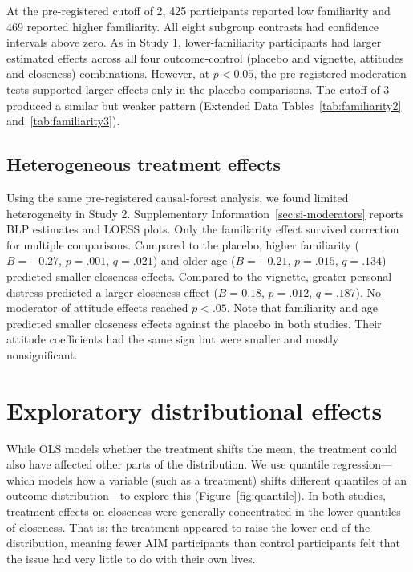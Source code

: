\documentclass[11pt]{article}
\begin{document}
At the pre-registered cutoff of 2, 425 participants reported low familiarity and 469 reported higher familiarity. All eight subgroup contrasts had confidence intervals above zero. As in Study 1, lower-familiarity participants had larger estimated effects across all four outcome-control (placebo and vignette, attitudes and closeness) combinations. However, at $p<0.05$, the pre-registered moderation tests supported larger effects only in the placebo comparisons. The cutoff of 3 produced a similar but weaker pattern (Extended Data Tables~\ref{tab:familiarity2} and~\ref{tab:familiarity3}).

\subsection{Heterogeneous treatment effects}
\label{sec:study-2-satellite-cybersecurity-heterogeneous-treatment-effects}

Using the same pre-registered causal-forest analysis, we found limited heterogeneity in Study 2. Supplementary Information~\ref{sec:si-moderators} reports BLP estimates and LOESS plots. Only the familiarity effect survived correction for multiple comparisons. Compared to the placebo, higher familiarity ($B=-0.27$, $p=.001$, $q=.021$) and older age ($B=-0.21$, $p=.015$, $q=.134$) predicted smaller closeness effects. Compared to the vignette, greater personal distress predicted a larger closeness effect ($B=0.18$, $p=.012$, $q=.187$). No moderator of attitude effects reached $p<.05$. Note that familiarity and age predicted smaller closeness effects against the placebo in both studies. Their attitude coefficients had the same sign but were smaller and mostly nonsignificant.

\section{Exploratory distributional effects}
\label{sec:exploratory-distributional-effects}
While OLS models whether the treatment shifts the mean, the treatment could also have affected other parts of the distribution. We use quantile regression---which models how a variable (such as a treatment) shifts different quantiles of an outcome distribution---to explore this (Figure~\ref{fig:quantile}). In both studies, treatment effects on closeness were generally concentrated in the lower quantiles of closeness. That is: the treatment appeared to raise the lower end of the distribution, meaning fewer AIM participants than control participants felt that the issue had very little to do with their own lives.
\end{document}
